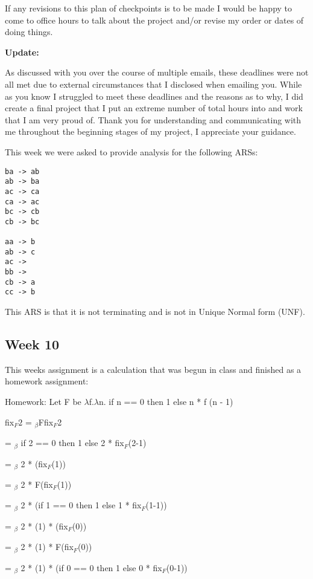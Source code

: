 \documentclass{article}
\theoremstyle{theorem}
\theoremstyle{definition}
\theoremstyle{remark}
\begin{document}
\medskip\noindent
If any revisions to this plan of checkpoints is to be made I would be happy to come to office hours to talk about the project and/or revise my order or dates of doing things.

\textbf{Update:}

As discussed with you over the course of multiple emails, these deadlines were not all met due to external circumstances that I disclosed when emailing you. While as you know I struggled to meet these deadlines and the reasons as to why, I did create a final project that I put an extreme number of total hours into and work that I am very proud of. Thank you for understanding and communicating with me throughout the beginning stages of my project, I appreciate your guidance.

\medskip\noindent
This week we were asked to provide analysis for the following ARSs:

\begin{lstlisting}
ba -> ab
ab -> ba
ac -> ca
ca -> ac
bc -> cb
cb -> bc

aa -> b
ab -> c
ac ->
bb ->
cb -> a
cc -> b
\end{lstlisting}

\medskip\noindent

This ARS is that it is not terminating and is not in Unique Normal form (UNF).

\medskip\noindent

\subsection{Week 10}
This weeks assignment is a calculation that was begun in class and finished as a homework assignment:

\medskip\noindent
Homework: Let F be $\lambda$f.$\lambda$n. if n == 0 then 1 else n * f (n - 1)

\medskip\noindent
fix$_{F}2$ = $_\beta$Ffix$_{F}$2

= $_\beta$ if 2 == 0 then 1 else 2 * fix$_{F}$(2-1)

= $_\beta$ 2 * (fix$_{F}$(1))

= $_\beta$ 2 * F(fix$_{F}$(1))

= $_\beta$ 2 * (if 1 == 0 then 1 else 1 * fix$_{F}$(1-1))

= $_\beta$ 2 * (1) * (fix$_{F}$(0))

= $_\beta$ 2 * (1) * F(fix$_{F}$(0))

= $_\beta$ 2 * (1) * (if 0 == 0 then 1 else 0 * fix$_{F}$(0-1))
\end{document}
